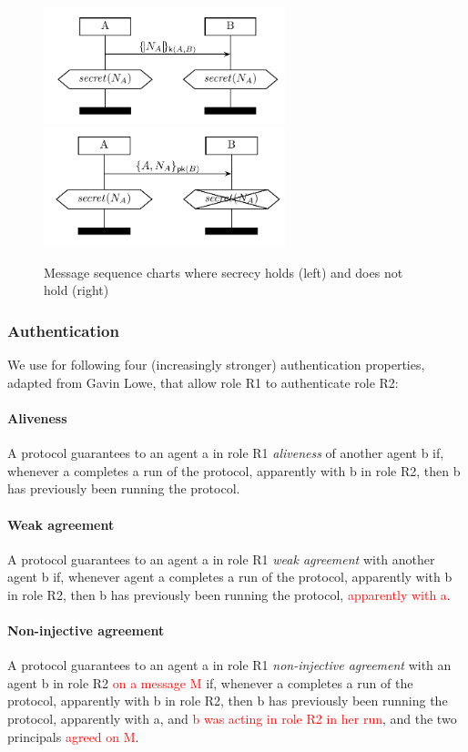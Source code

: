 \begin{figure}[h]
    \centering
    \includegraphics[width=7cm]{images/ch7-msc-secret.png}
    \hspace{1cm}
    \includegraphics[width=7cm]{images/ch7-msc-not-secret.png}
    \caption{Message sequence charts where secrecy holds (left) and does not hold (right)}
    \label{fig:msc-secret}
\end{figure}


\subsubsection{Authentication}

We use for following four (increasingly stronger) authentication properties, adapted from Gavin Lowe, that allow role R1 to authenticate role R2:

\paragraph{Aliveness} A protocol guarantees to an agent a in role R1 \emph{aliveness} of another agent b if, whenever a completes a run of the protocol, apparently with b in role R2, then b has previously been running the protocol.

\paragraph{Weak agreement} A protocol guarantees to an agent a in role R1 \emph{weak agreement} with another agent b if, whenever agent a completes a run of the protocol, apparently with b in role R2, then b has previously been running the protocol, \textcolor{red}{apparently with a}.

\paragraph{Non-injective agreement} A protocol guarantees to an agent a in role R1 \emph{non-injective agreement} with an agent b in role R2 \textcolor{red}{on a message M} if, whenever a completes a run of the protocol, apparently with b in role R2, then b has previously been running the protocol, apparently with a, and \textcolor{red}{b was acting in role R2 in her run}, and the two principals \textcolor{red}{agreed on M}.

